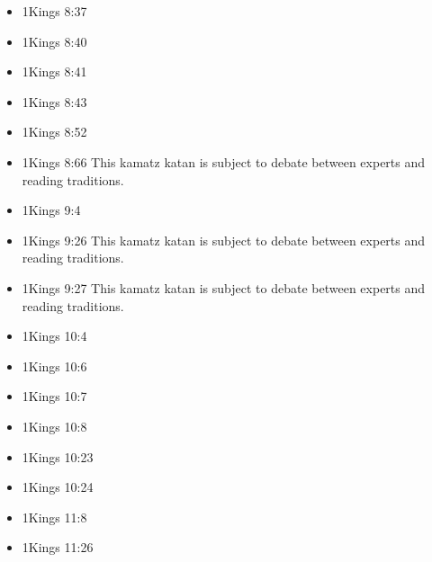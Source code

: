 \documentclass[14pt]{article}
\begin{document}
\begin{multicols}{2}
\begin{itemize}
									\item 1Kings 8:37
									
									\item 1Kings 8:40
									
									\item 1Kings 8:41
									
									\item 1Kings 8:43
									
									\item 1Kings 8:52
									
									\item 1Kings 8:66 This kamatz katan is subject to debate between experts and reading traditions.
									
									\item 1Kings 9:4
									
									\item 1Kings 9:26 This kamatz katan is subject to debate between experts and reading traditions.
									
									\item 1Kings 9:27 This kamatz katan is subject to debate between experts and reading traditions.
									
									\item 1Kings 10:4
									
									\item 1Kings 10:6
									
									\item 1Kings 10:7
									
									\item 1Kings 10:8
									
									\item 1Kings 10:23
											
											\item 1Kings 10:24
											
											\item 1Kings 11:8
											
											\item 1Kings 11:26
											

\end{itemize}
\end{multicols}
\end{document}

